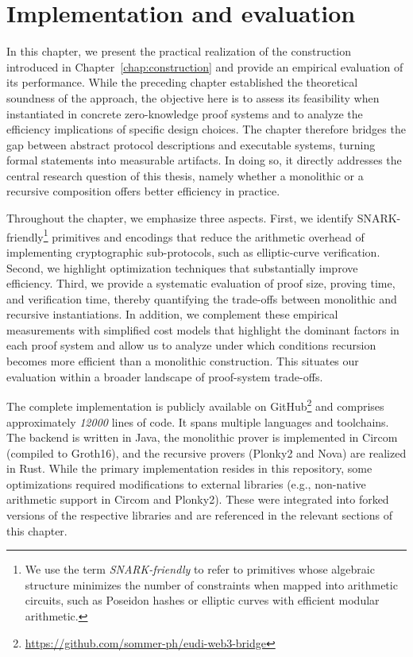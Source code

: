 \chapter{Implementation and evaluation}
\label{chap:implementation-evaluation}
In this chapter, we present the practical realization of the construction introduced in Chapter~\ref{chap:construction} and provide an empirical evaluation of its performance. While the preceding chapter established the theoretical soundness of the approach, the objective here is to assess its feasibility when instantiated in concrete zero-knowledge proof systems and to analyze the efficiency implications of specific design choices. The chapter therefore bridges the gap between abstract protocol descriptions and executable systems, turning formal statements into measurable artifacts. In doing so, it directly addresses the central research question of this thesis, namely whether a monolithic or a recursive composition offers better efficiency in practice.

Throughout the chapter, we emphasize three aspects. First, we identify SNARK-friendly\footnote{We use the term \emph{SNARK-friendly} to refer to primitives whose algebraic structure minimizes the number of constraints when mapped into arithmetic circuits, such as Poseidon hashes or elliptic curves with efficient modular arithmetic.} primitives and encodings that reduce the arithmetic overhead of implementing cryptographic sub-protocols, such as elliptic-curve verification. Second, we highlight optimization techniques that substantially improve efficiency. Third, we provide a systematic evaluation of proof size, proving time, and verification time, thereby quantifying the trade-offs between monolithic and recursive instantiations. In addition, we complement these empirical measurements with simplified cost models that highlight the dominant factors in each proof system and allow us to analyze under which conditions recursion becomes more efficient than a monolithic construction. This situates our evaluation within a broader landscape of proof-system trade-offs.

The complete implementation is publicly available on GitHub\footnote{\url{https://github.com/sommer-ph/eudi-web3-bridge}} and comprises approximately \emph{12000} lines of code. It spans multiple languages and toolchains. The backend is written in Java, the monolithic prover is implemented in Circom (compiled to Groth16), and the recursive provers (Plonky2 and Nova) are realized in Rust. While the primary implementation resides in this repository, some optimizations required modifications to external libraries (e.g., non-native arithmetic support in Circom and Plonky2). These were integrated into forked versions of the respective libraries and are referenced in the relevant sections of this chapter.







